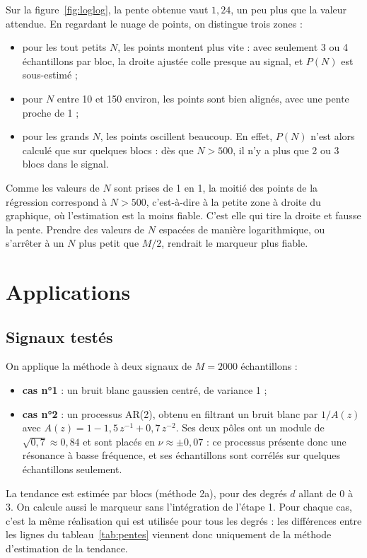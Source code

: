 \documentclass[11pt,a4paper]{article}
\begin{document}
Sur la figure~\ref{fig:loglog}, la pente obtenue vaut $1{,}24$, un peu plus que la valeur
attendue. En regardant le nuage de points, on distingue trois zones :
\begin{itemize}
  \item pour les tout petits $N$, les points montent plus vite : avec seulement 3 ou 4
  échantillons par bloc, la droite ajustée colle presque au signal, et $P(N)$ est
  sous-estimé ;
  \item pour $N$ entre 10 et 150 environ, les points sont bien alignés, avec une pente
  proche de 1 ;
  \item pour les grands $N$, les points oscillent beaucoup. En effet, $P(N)$ n'est alors
  calculé que sur quelques blocs : dès que $N > 500$, il n'y a plus que 2 ou 3 blocs dans
  le signal.
\end{itemize}
Comme les valeurs de $N$ sont prises de 1 en 1, la moitié des points de la régression
correspond à $N > 500$, c'est-à-dire à la petite zone à droite du graphique, où
l'estimation est la moins fiable. C'est elle qui tire la droite et fausse la pente. Prendre
des valeurs de $N$ espacées de manière logarithmique, ou s'arrêter à un $N$ plus petit que
$M/2$, rendrait le marqueur plus fiable.

\section{Applications}

\subsection{Signaux testés}

On applique la méthode à deux signaux de $M = 2000$ échantillons :
\begin{itemize}
  \item \textbf{cas n°1} : un bruit blanc gaussien centré, de variance 1 ;
  \item \textbf{cas n°2} : un processus AR(2), obtenu en filtrant un bruit blanc par
  $1/A(z)$ avec $A(z) = 1 - 1{,}5\,z^{-1} + 0{,}7\,z^{-2}$. Ses deux pôles ont un module de
  $\sqrt{0{,}7} \approx 0{,}84$ et sont placés en $\nu \approx \pm 0{,}07$ : ce processus
  présente donc une résonance à basse fréquence, et ses échantillons sont corrélés sur
  quelques échantillons seulement.
\end{itemize}
La tendance est estimée par blocs (méthode 2a), pour des degrés $d$ allant de 0 à 3. On
calcule aussi le marqueur sans l'intégration de l'étape 1. Pour chaque cas, c'est la même
réalisation qui est utilisée pour tous les degrés : les différences entre les lignes du
tableau~\ref{tab:pentes} viennent donc uniquement de la méthode d'estimation de la tendance.
\end{document}

